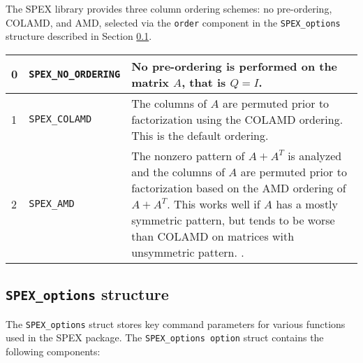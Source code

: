 \documentclass[12pt]{report}
\theoremstyle{definition}
\begin{document}
The SPEX library provides three column ordering schemes: no pre-ordering,
COLAMD, and AMD, selected via the \verb|order|
component in the \verb|SPEX_options| structure described in Section
\ref{ss:SPEX_options_struct}.

{\small
\begin{center}
\begin{tabular}{llp{4in}}
\hline
0 & \verb|SPEX_NO_ORDERING| & No pre-ordering is performed on the matrix $A$,
                              that is $Q = I$. \\
\hline
1 & \verb|SPEX_COLAMD|      & The columns of $A$ are permuted prior to
                              factorization using the COLAMD
                              \cite{davis2004algorithmcolamd} ordering.
                              This is the default ordering. \\
\hline
2 & \verb|SPEX_AMD|         & The nonzero pattern of $A + A^T$ is analyzed and
                              the columns of $A$ are permuted prior to
                              factorization based on the AMD
                              \cite{amestoy2004algorithmamd} ordering of
                              $A+A^T$. This works well if $A$ has a mostly
                              symmetric pattern, but tends to be worse
                              than COLAMD on matrices with unsymmetric pattern.
                              \cite{davis2004column}.\\
\hline
\end{tabular}
\label{tab:SPEX_pivot}
\end{center}
}

\cprotect\subsection{ \verb|SPEX_options| structure}
\label{ss:SPEX_options_struct}

The \verb|SPEX_options| struct stores key command parameters for various
functions used in the SPEX package. The \verb|SPEX_options option| struct
contains the following components:
\end{document}
